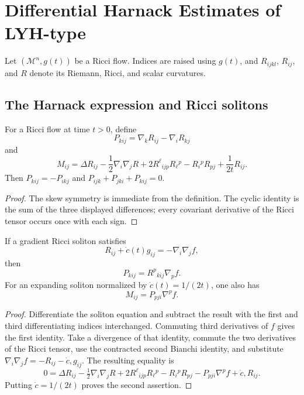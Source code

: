 \chapter[15]{Differential Harnack Estimates of LYH-type}
\label{ch:chow-ii-differential-harnack-estimates}

Let \((\mathcal M^n,g(t))\) be a Ricci flow.  Indices are raised using
\(g(t)\), and \(R_{ijkl}\), \(R_{ij}\), and \(R\) denote its Riemann,
Ricci, and scalar curvatures.

\section{The Harnack expression and Ricci solitons}

\begin{definition}
\label{def:chow-ii-harnack-p-and-m-tensors}
For a Ricci flow at time \(t>0\), define
\[
P_{kij}=\nabla_kR_{ij}-\nabla_iR_{kj}
\]
and
\[
M_{ij}=\Delta R_{ij}-\frac12\nabla_i\nabla_jR
 +2R^{\ell}{}_{ijp}R_{\ell}{}^p-R_i{}^pR_{pj}+\frac1{2t}R_{ij}.
\]
Then \(P_{kij}=-P_{ikj}\) and
\(P_{ijk}+P_{jki}+P_{kij}=0\).
\end{definition}
\begin{proof}
\sketch The skew symmetry is immediate from the definition.  The cyclic identity is
the sum of the three displayed differences; every covariant derivative of the
Ricci tensor occurs once with each sign.
\end{proof}

\begin{lemma}
\label{lem:chow-ii-soliton-harnack-identities}
If a gradient Ricci soliton satisfies
\[
R_{ij}+\dot c(t)g_{ij}=-\nabla_i\nabla_jf,
\]
then
\[
P_{kij}=R^p{}_{kij}\nabla_pf.
\]
For an expanding soliton normalized by \(\dot c(t)=1/(2t)\), one also has
\[
M_{ij}=P_{pji}\nabla^pf.
\]
\end{lemma}
\begin{proof}
\sketch Differentiate the soliton equation and subtract the result with the first and
third differentiating indices interchanged.  Commuting third derivatives of
\(f\) gives the first identity.  Take a divergence of that identity, commute
the two derivatives of the Ricci tensor, use the contracted second Bianchi
identity, and substitute
\(\nabla_i\nabla_jf=-R_{ij}-\dot c,g_{ij}\).  The resulting equality is
\[
0=\Delta R_{ij}-\tfrac12\nabla_i\nabla_jR
 +2R^\ell{}_{ijp}R_\ell{}^p-R_i{}^pR_{pj}
-P_{pji}\nabla^pf+\dot c,R_{ij}.
\]
Putting \(\dot c=1/(2t)\) proves the second assertion.
\end{proof}

